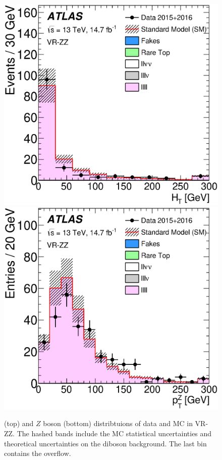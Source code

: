 \begin{centering}
\begin{figure}[htbp]
\centering
\includegraphics[width=.9\textwidth]{figures/dibosons/figaux_11c.eps}
\includegraphics[width=.9\textwidth]{figures/dibosons/figaux_11d.eps}
\caption{\HT (top) and $Z$ boson \pt (bottom) distribtuions of data and \ac{MC} in VR-ZZ. The hashed bands include the MC statistical uncertainties and theoretical uncertainties on the diboson background. The last bin contains the overflow. \label{fig:diboson_zz}}
\end{figure}
\end{centering}



